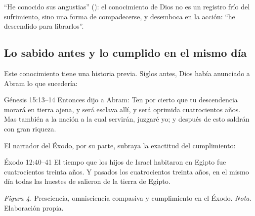 ``He conocido sus angustias'' (): el conocimiento de Dios no es un registro frío del sufrimiento, sino una forma de compadecerse, y desemboca en la acción: ``he descendido para librarlos''.

\subsection{Lo sabido antes y lo cumplido en el mismo día}
Este conocimiento tiene una historia previa. Siglos antes, Dios había anunciado a Abram lo que sucedería:

\begin{verso}{Génesis 15:13–14}
Entonces \SENOR{} dijo a Abram: Ten por cierto que tu descendencia morará en tierra ajena, y será esclava allí, y será oprimida cuatrocientos años. Mas también a la nación a la cual servirán, juzgaré yo; y después de esto saldrán con gran riqueza.
\end{verso}

El narrador del Éxodo, por su parte, subraya la exactitud del cumplimiento:

\begin{verso}{Éxodo 12:40–41}
El tiempo que los hijos de Israel habitaron en Egipto fue cuatrocientos treinta años. Y pasados los cuatrocientos treinta años, en el mismo día todas las huestes de \SENOR{} salieron de la tierra de Egipto.
\end{verso}

\begin{center}
\par
{\footnotesize\color{gris}\textit{Figura 4.} Presciencia, omnisciencia compasiva y cumplimiento en el Éxodo. \textit{Nota.} Elaboración propia.}
\end{center}

